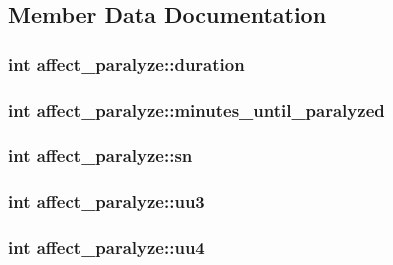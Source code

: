 \subsection{Member Data Documentation}
\hypertarget{structaffect__paralyze_adf1d5a35c8008cbad0ca5ce8698bb0ce}{
\subsubsection[{duration}]{\setlength{\rightskip}{0pt plus 5cm}int affect\-\_\-paralyze\-::duration}}\label{structaffect__paralyze_adf1d5a35c8008cbad0ca5ce8698bb0ce}
\hypertarget{structaffect__paralyze_a04d90c64680ac57d6ef11d1bdea032c5}{
\subsubsection[{minutes\-\_\-until\-\_\-paralyzed}]{\setlength{\rightskip}{0pt plus 5cm}int affect\-\_\-paralyze\-::minutes\-\_\-until\-\_\-paralyzed}}\label{structaffect__paralyze_a04d90c64680ac57d6ef11d1bdea032c5}
\hypertarget{structaffect__paralyze_aa401701137676487fbdea56cbd0f2753}{
\subsubsection[{sn}]{\setlength{\rightskip}{0pt plus 5cm}int affect\-\_\-paralyze\-::sn}}\label{structaffect__paralyze_aa401701137676487fbdea56cbd0f2753}
\hypertarget{structaffect__paralyze_a0680ad907c4ea80ef81bcbda834c4105}{
\subsubsection[{uu3}]{\setlength{\rightskip}{0pt plus 5cm}int affect\-\_\-paralyze\-::uu3}}\label{structaffect__paralyze_a0680ad907c4ea80ef81bcbda834c4105}
\hypertarget{structaffect__paralyze_a82390b9ea39b080722ba847b7436d7e0}{
\subsubsection[{uu4}]{\setlength{\rightskip}{0pt plus 5cm}int affect\-\_\-paralyze\-::uu4}}\label{structaffect__paralyze_a82390b9ea39b080722ba847b7436d7e0}
